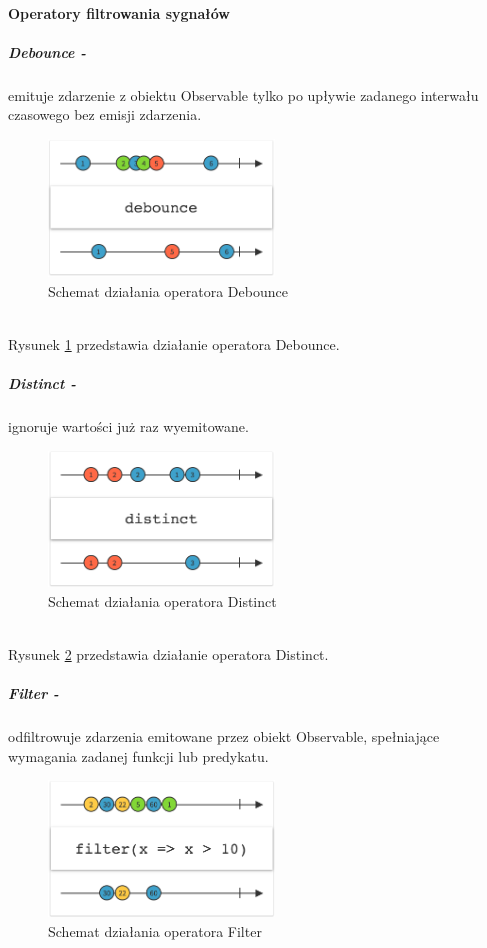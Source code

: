 \documentclass[12pt,oneside,a4paper]{report}
\begin{document}
\paragraph{Operatory filtrowania sygnałów}
\subparagraph{Debounce -}emituje zdarzenie z obiektu Observable tylko po upływie zadanego interwału czasowego bez emisji zdarzenia.
\begin{figure}[ht!]
	\centering
	\includegraphics[width=6cm]{debounce}
	\caption{Schemat działania operatora Debounce\cite{marbles}}
	\label{debounce}
\end{figure}\\
Rysunek \ref{debounce} przedstawia działanie operatora Debounce.
\subparagraph{Distinct -}ignoruje wartości już raz wyemitowane.
\begin{figure}[ht!]
	\centering
	\includegraphics[width=6cm]{distinct}
	\caption{Schemat działania operatora Distinct\cite{marbles}}
	\label{distinct}
\end{figure}\\
Rysunek \ref{distinct} przedstawia działanie operatora Distinct.
\subparagraph{Filter -}odfiltrowuje zdarzenia emitowane przez obiekt Observable, spełniające wymagania zadanej funkcji lub predykatu.
\begin{figure}[ht!]
	\centering
	\includegraphics[width=6cm]{filter}
	\caption{Schemat działania operatora Filter\cite{marbles}}
	\label{filter}
\end{figure}
\end{document}
